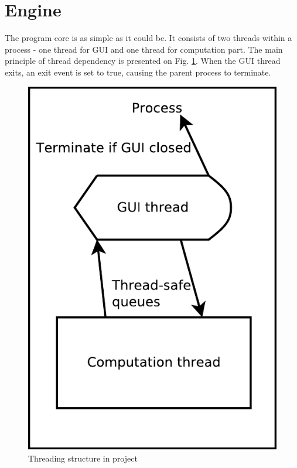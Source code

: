 \section{Engine}

The program core is as simple as it could be. It consists of two threads within a process - one thread for GUI and one thread for computation part. The main principle of thread dependency is presented on Fig. \ref{Fig:threads}. When the GUI thread exits, an exit event is set to true, causing the parent process to terminate.

\begin{figure}
\centering
\includegraphics[scale=0.6]{figures/threads}

\caption[Threads scheme]{\label{Fig:threads}Threading structure in project}
\end{figure}

